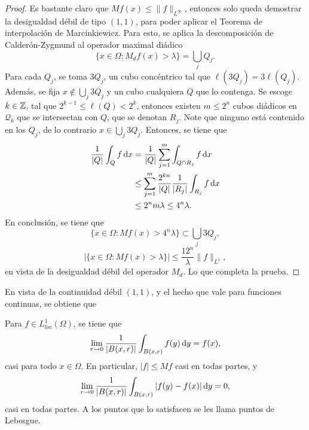 \begin{proof}
	Es bastante claro que $Mf(x) \leq \|f\|_{L^\infty}$, entonces solo queda demostrar la desigualdad débil de tipo $(1,1)$, para poder aplicar el Teorema de interpolación de Marcinkiewicz. Para esto, se aplica la descomposición de Calderón-Zygmund al operador maximal diádico
	\begin{equation*}
		\{x\in\Omega:M_df(x)>\lambda\} = \bigcup_jQ_j.
	\end{equation*}
	Para cada $Q_j$, se toma $3Q_j$, un cubo concéntrico tal que $\ell(3Q_j) = 3\ell(Q_j)$. Además, se fija $x \notin \bigcup_j 3Q_j$ y un cubo cualquiera $Q$ que lo contenga. Se escoge $k\in\mathbb{Z}$, tal que $2^{k-1}\leq\ell(Q)<2^k$, entonces existen $m\leq 2^n$ cubos diádicos en $\mathcal{Q}_k$ que se intersectan con $Q$, que se denotan $R_j$. Note que ninguno está contenido en los $Q_j$, de lo contrario $x\in \bigcup_j 3Q_j$. Entonces, se tiene que 
	\begin{align*}
		\frac{1}{|Q|} \int_Q f \mathop{}\!\mathrm{d} x &= \frac{1}{|Q|}\sum_{j=1}^m \int_{Q\cap R_j} f \mathop{}\!\mathrm{d} x \\
		& \leq \sum_{j=1}^m \frac{2^{kn}}{|Q|}\frac{1}{|R_j|}\int_{R_j} f\mathop{}\!\mathrm{d} x \\
		& \leq 2^nm\lambda \leq 4^n\lambda.
	\end{align*}
	En conclusión, se tiene que 
	\begin{equation*}
		\{x\in\Omega:Mf(x)>4^n\lambda\} \subset \bigcup_j3Q_j,
	\end{equation*}
	\begin{equation*}
		|\{x\in\Omega:Mf(x)>\lambda\}| \leq \frac{12^n}{\lambda}\|f\|_{L^1},
	\end{equation*}
	en vista de la desigualdad débil del operador $M_d$. Lo que completa la prueba.
\end{proof}
En vista de la continuidad débil $(1, 1)$, y el hecho que vale para funciones continuas, se obtiene que
\begin{corollary}
	Para $f\in L^1_{loc}(\Omega)$, se tiene que 
	\begin{equation*}
		\lim_{r\to0}\frac{1}{|B(x, r)|} \int_{B(x, r)} f(y) \mathop{}\!\mathrm{d} y = f(x),
	\end{equation*}
	casi para todo $x\in\Omega$.  En particular, $|f|\leq Mf$ casi en todas partes, y
	\begin{equation*}
		\lim_{r\to0}\frac{1}{|B(x, r)|} \int_{B(x, r)} |f(y)-f(x)| \mathop{}\!\mathrm{d} y = 0,
	\end{equation*}
	casi en todas partes. A los puntos que lo satisfacen se les llama puntos de Lebesgue.
\end{corollary}
